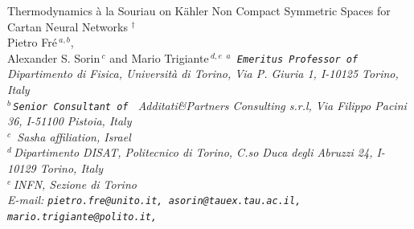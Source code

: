 \documentclass[10pt,a4paper]{article}
\begin{document}
\begin{titlepage}
\begin{center}
\vskip 0.2cm
{{\large {\sc   Thermodynamics {\`a} la Souriau on K\"ahler Non Compact Symmetric Spaces for  Cartan Neural Networks
  ${}^\dagger$}} }\\
 \vskip 1cm {\sc Pietro Fr\'e\,$^{a,b}$,  \\ Alexander S. Sorin\,$^{c}$
 and Mario Trigiante\,$^{d, e}$} \vskip 0.5cm
\smallskip
{\sl \small \frenchspacing ${}^a\,$ {\tt Emeritus Professor of}  Dipartimento di Fisica, 
Universit\`a di Torino, Via P. Giuria 1, I-10125 Torino, Italy \\[2pt]
${}^{b}\,${\tt Senior Consultant of } Additati\&Partners Consulting s.r.l, 
Via Filippo Pacini 36, I-51100 Pistoia, Italy \\[2pt]
${}^c\,$ Sasha affiliation, Israel \\[2pt]
${}^d\,$Dipartimento DISAT, Politecnico di Torino,
C.so Duca degli Abruzzi 24, I-10129 Torino, Italy\\[2pt]
${}^e\,$INFN, Sezione di Torino\\[2pt]


E-mail:  {\tt pietro.fre@unito.it, asorin@tauex.tau.ac.il,\\
 mario.trigiante@polito.it, } }


\end{center}
\end{titlepage}
\end{document}
